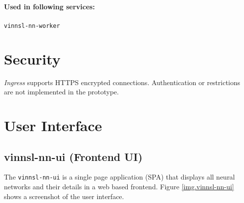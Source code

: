 \paragraph{Used in following
services:}\label{used-in-following-services-5}

\texttt{vinnsl-nn-worker}

\section{Security}\label{security}

\emph{Ingress} supports HTTPS encrypted connections. Authentication or
restrictions are not implemented in the prototype.

\section{User Interface}\label{user-interface-1}

\subsection{vinnsl-nn-ui (Frontend UI)}\label{vinnsl-nn-ui-frontend-ui}

The \texttt{vinnsl-nn-ui} is a single page application (SPA) that
displays all neural networks and their details in a web based frontend.
Figure \ref{img.vinnsl-nn-ui} shows a screenshot of the user interface.

